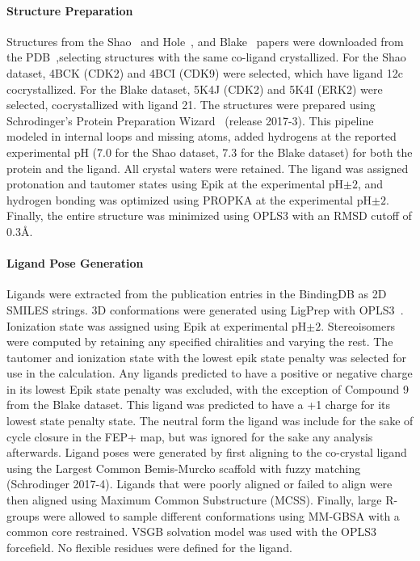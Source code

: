 \documentclass[9pt,lineno]{elife-modified} %
\begin{document}
\paragraph{Structure Preparation}
Structures from the Shao~\citep{Shao2013-oe} and Hole~\citep{Hole2013-sr}, and Blake~\citep{Blake2016-su} papers were downloaded from the PDB~\citep{Berman2002-hg},selecting structures with the same co-ligand crystallized. For the Shao dataset, 4BCK (CDK2) and 4BCI (CDK9) were selected, which have ligand 12c cocrystallized. For the Blake dataset, 5K4J (CDK2) and 5K4I (ERK2) were selected, cocrystallized with ligand 21. The structures were prepared using Schrodinger’s Protein Preparation Wizard~\citep{Sastry2013-ax} (release 2017-3). This pipeline modeled in internal loops and missing atoms, added hydrogens at the reported experimental pH (7.0 for the Shao dataset, 7.3 for the Blake dataset) for both the protein and the ligand. All crystal waters were retained. The ligand was assigned protonation and tautomer states using Epik at the experimental pH$\pm2$, and hydrogen bonding was optimized using PROPKA at the experimental pH$\pm2$. Finally, the entire structure was minimized using OPLS3 with an RMSD cutoff of 0.3\AA.

\paragraph{Ligand Pose Generation}
Ligands were extracted from the publication entries in the BindingDB as 2D SMILES strings. 3D conformations were generated using LigPrep with OPLS3~\citep{Harder2016-zn}. Ionization state was assigned using Epik at experimental pH$\pm2$. Stereoisomers were computed by retaining any specified chiralities and varying the rest. The tautomer and ionization state with the lowest epik state penalty was selected for use in the calculation. Any ligands predicted to have a positive or negative charge in its lowest Epik state penalty was excluded, with the exception of Compound 9 from the Blake dataset. This ligand was predicted to have a +1 charge for its lowest state penalty state. The neutral form the ligand was include for the sake of cycle closure in the FEP+ map, but was ignored for the sake any analysis afterwards. Ligand poses were generated by first aligning to the co-crystal ligand using the Largest Common Bemis-Murcko scaffold with fuzzy matching (Schrodinger 2017-4). Ligands that were poorly aligned or failed to align were then aligned using Maximum Common Substructure (MCSS). Finally, large R-groups were allowed to sample different conformations using MM-GBSA with a common core restrained. VSGB solvation model was used with the OPLS3 forcefield. No flexible residues were defined for the ligand. 
\end{document}
